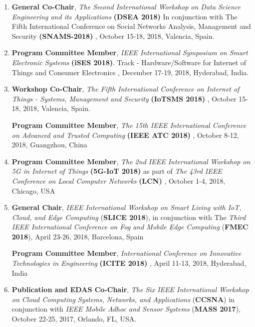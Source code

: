 
\begin{enumerate} [label=(\arabic*).]


\item
\textbf{General Co-Chair}, \textit{The Second International Workshop on Data Science Engineering and its Applications} \textbf{(DSEA 2018)} In conjunction with 
The Fifth International Conference on Social Networks Analysis, Management and Security \textbf{(SNAMS-2018) }, October 15-18, 2018, Valencia, Spain.

\item
\textbf{Program Committee Member}, \textit{IEEE International Symposium on Smart Electronic Systems} \textbf{(iSES 2018)}. Track - Hardware/Software for Internet of Things and Consumer Electronics , December 17-19, 2018, Hyderabad, India.

\item
\textbf{Workshop Co-Chair}, \textit{The Fifth International Conference on Internet of Things - Systems, Management and Security} \textbf{(IoTSMS 2018)} , October 15-18, 2018, Valencia, Spain.

\textbf{Program Committee Member}, \textit{The 15th IEEE International Conference on Advanced and Trusted Computing} \textbf{(IEEE ATC 2018)} , October 8-12, 2018, Guangzhou, China

\item
\textbf{Program Committee Member}, \textit{The 2nd IEEE International Workshop on 5G in Internet of Things} \textbf{(5G-IoT 2018)} as part of \textit{The 43rd IEEE Conference on Local Computer Networks} \textbf{(LCN)} , October 1-4, 2018, Chicago, USA

\item
\textbf{General Chair}, \textit{IEEE International Workshop on Smart Living with IoT, Cloud, and Edge Computing }(\textbf{SLICE 2018}), in conjunction with The \textit{Third IEEE International Conference on Fog and Mobile Edge Computing} (\textbf{FMEC 2018}), April 23-26, 2018, Barcelona, Spain

\textbf{Program Committee Member}, \textit{International Conference on Innovative Technologies in Engineering} \textbf{(ICITE 2018) }, April 11-13, 2018, Hyderabad, India

\item
\textbf{Publication and EDAS Co-Chair}, \textit{The Six IEEE International Workshop on Cloud Computing Systems, Networks, and Applications }(\textbf{CCSNA}) in conjunction with \textit{IEEE Mobile Adhoc and Sensor Systems} (\textbf{MASS 2017}), October 22-25, 2017, Orlando, FL, USA.


\end{enumerate}
